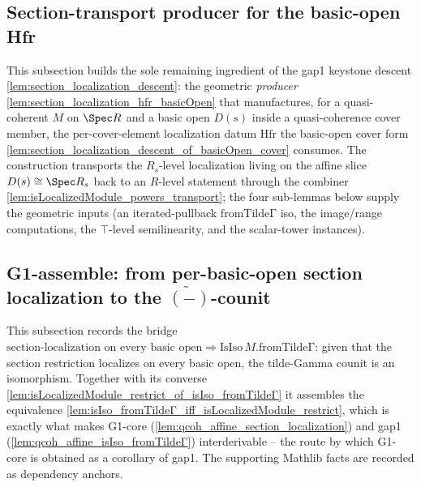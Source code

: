 



\subsection{Section-transport producer for the basic-open Hfr}

This subsection builds the sole remaining ingredient of the gap1 keystone descent
\cref{lem:section_localization_descent}: the geometric \emph{producer}
\cref{lem:section_localization_hfr_basicOpen} that manufactures, for a quasi-coherent \(M\) on
\(\Spec R\) and a basic open \(D(s)\) inside a quasi-coherence cover member, the per-cover-element
localization datum \(\mathrm{Hfr}\) the basic-open cover form
\cref{lem:section_localization_descent_of_basicOpen_cover} consumes. The construction transports the
\(R_s\)-level localization living on the affine slice \(D(s) \cong \Spec R_s\) back to an
\(R\)-level statement through the combiner \cref{lem:isLocalizedModule_powers_transport}; the four
sub-lemmas below supply the geometric inputs (an iterated-pullback \(\mathrm{fromTildeΓ}\) iso, the
image/range computations, the \(\top\)-level semilinearity, and the scalar-tower instances).


\subsection{G1-assemble: from per-basic-open section localization to the
\texorpdfstring{$\widetilde{(-)}$}{tilde}-counit}

This subsection records the bridge \(\text{section-localization on every basic open} \Rightarrow
\mathrm{IsIso}\,M.\mathrm{fromTildeΓ}\): given that the section restriction localizes on every basic
open, the tilde-Gamma counit is an isomorphism. Together with its converse
\cref{lem:isLocalizedModule_restrict_of_isIso_fromTildeΓ} it assembles the equivalence
\cref{lem:isIso_fromTildeΓ_iff_isLocalizedModule_restrict}, which is exactly what makes G1-core
(\cref{lem:qcoh_affine_section_localization}) and gap1
(\cref{lem:qcoh_affine_isIso_fromTildeΓ}) interderivable -- the route by which G1-core is obtained as
a corollary of gap1. The supporting Mathlib facts are recorded as dependency anchors.

